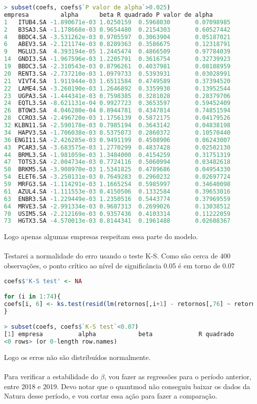 \documentclass[12pt]{article}
\begin{document}
\begin{lstlisting}[language=R]
> subset(coefs, coefs$`P valor de alpha`>0.025)
empresa         alpha      beta R quadrado P valor de alpha
1   ITUB4.SA -1.890671e-03 1.0250159  0.5968030       0.07098985
2   B3SA3.SA -1.178668e-03 0.9654480  0.2154303       0.60527442
4   BBDC4.SA -3.531262e-03 0.9705597  0.3063904       0.05187021
6   ABEV3.SA -2.121174e-03 0.8289363  0.3586675       0.12318791
9   MGLU3.SA  4.393194e-05 1.2445474  0.4866509       0.97784039
14  GNDI3.SA -1.967596e-03 1.2205791  0.3616754       0.32739923
19  BBDC3.SA -2.310543e-03 0.8796261  0.4037981       0.08188959
20  RENT3.SA -2.737210e-03 1.0979733  0.5393931       0.03028991
21  VIVT4.SA  1.911944e-03 1.6511584  0.4749589       0.37394520
22  LAME4.SA -3.260190e-03 1.2646892  0.3359930       0.13952544
23  UGPA3.SA -1.444341e-03 0.7598385  0.3281028       0.28379706
24  EQTL3.SA -8.621131e-04 0.9927723  0.3653597       0.59452409
26  BTOW3.SA  4.046280e-04 0.8944781  0.4347814       0.74851594
28  CCRO3.SA -2.496720e-03 1.1756139  0.5872175       0.04179526
32 KLBN11.SA -2.590178e-03 0.7985194  0.3643142       0.04838198
34  HAPV3.SA -1.706038e-03 0.5375073  0.2860372       0.10570440
36 ENGI11.SA -2.426285e-03 0.9491199  0.4508906       0.06243007
43  PCAR3.SA -3.683575e-03 1.2770299  0.4837428       0.02502130
44  BRML3.SA -1.981059e-03 1.3484000  0.4154259       0.31751319
47  TOTS3.SA -2.004734e-03 0.7724116  0.5060994       0.03482618
50  BRKM5.SA -3.908970e-03 1.5341825  0.4789686       0.04954330
54  ELET6.SA -3.250131e-03 0.7649283  0.2960232       0.02697724
59  MRFG3.SA -1.114291e-03 1.1665254  0.5985997       0.34640098
61  AZUL4.SA -1.111553e-03 0.4150506  0.1332584       0.39653016
63  ENBR3.SA -1.229449e-03 1.2350516  0.5443774       0.37969559
64  MRVE3.SA -2.991334e-03 0.9687313  0.2699026       0.13038512
70  USIM5.SA -2.212169e-03 0.9357436  0.4103314       0.11222059
73  HGTX3.SA -4.570013e-03 0.8144341  0.1961488       0.02608367
\end{lstlisting}
Logo apenas algumas empresas respeitam essa parte do modelo.\\\\
Testarei a normalidade do erro usando o teste K-S. Como são cerca de 400 observações, o ponto crítico ao nível de significância 0.05 é em torno de 0.07
\begin{lstlisting}[language=R]
coefs$'K-S test' <- NA

for (i in 1:74){
coefs[i, 6] <- ks.test(resid(lm(retornos[,i+1] - retornos[,76] ~ retornos[,1] - retornos[,76])), "pnorm")
}

> subset(coefs, coefs$`K-S test`<0.07)
[1] empresa          alpha            beta             R quadrado       P valor de alpha K-S test        
<0 rows> (or 0-length row.names)
\end{lstlisting}
Logo os erros não são distribuídos normalmente. \\\\
Para verificar a estabilidade do $\beta$, vou fazer as regressões para o período anterior, entre 2018 e 2019. Devo notar que o quantmod não conseguiu baixar os dados da Natura desse período, e vou cortar essa ação para fazer a comparação.
\end{document}
